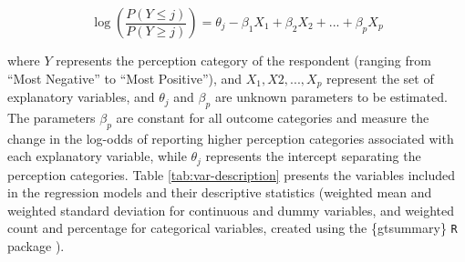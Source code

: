\documentclass[preprint, 3p,
authoryear]{elsarticle} %
\begin{document}
\begin{equation}
\label{eq:ordinal-logit}
\log(\frac{P(Y\le j)}{P(Y\ge j)}) = \theta_j - \beta_1 X_1 + \beta_2 X_2 + ... + \beta_p X_p
\end{equation}

\noindent where \(Y\) represents the perception category of the
respondent (ranging from ``Most Negative'' to ``Most Positive''), and
\(X_1, X2, ..., X_p\) represent the set of explanatory variables, and
\(\theta_j\) and \(\beta_p\) are unknown parameters to be estimated. The
parameters \(\beta_p\) are constant for all outcome categories and
measure the change in the log-odds of reporting higher perception
categories associated with each explanatory variable, while \(\theta_j\)
represents the intercept separating the perception categories. Table
\ref{tab:var-description} presents the variables included in the
regression models and their descriptive statistics (weighted mean and
weighted standard deviation for continuous and dummy variables, and
weighted count and percentage for categorical variables, created using
the \{gtsummary\} \texttt{R} package \citep{gtsummary}).
\end{document}
